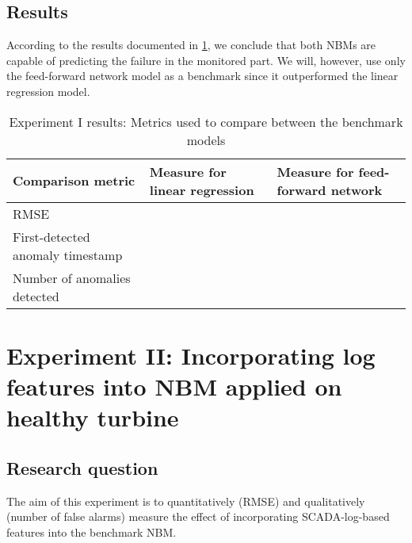 \subsection{Results}
According to the results documented in \ref{tab:Experiment I results}, we conclude that both NBMs are capable of predicting the failure in the monitored part. We will, however, use only the feed-forward network model as a benchmark since it outperformed the linear regression model.
\begin{table}[H]
        \centering
    \begin{tabular}{|m{4cm}|m{4cm}|m{4cm}|}
    \hline
         \textbf{Comparison metric} & \textbf{Measure for linear regression}   & \textbf{Measure for feed-forward network}\\
         \hline
         RMSE & & \\
         \hline
         First-detected anomaly timestamp & & \\
         \hline
         Number of anomalies detected & & \\
         \hline
    \hline
    \end{tabular}
    \caption{Experiment I results: Metrics used to compare between the benchmark models}
        \label{tab:Experiment I results}
\end{table}


\section{Experiment II: Incorporating log features into NBM applied on healthy turbine}

\subsection{Research question}
The aim of this experiment is to quantitatively (RMSE) and qualitatively (number of false alarms) measure the effect of incorporating SCADA-log-based features into the benchmark NBM.

